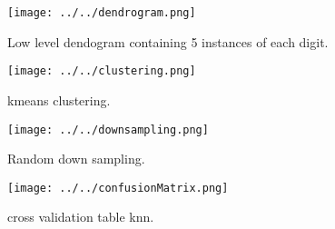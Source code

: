 \documentclass[paper=a4, fontsize=11pt]{scrartcl} %
\begin{document}
\begin{figure}[h]
	\centering
	\texttt{[image: ../../dendrogram.png]}
	\caption{Low level dendogram containing 5 instances of each digit.}
	\label{fig:scree}
\end{figure}

\begin{figure}[h]
	\centering
	\texttt{[image: ../../clustering.png]}
	\caption{kmeans clustering.}
	\label{fig:scree}
\end{figure}

\begin{figure}[h]
	\centering
	\texttt{[image: ../../downsampling.png]}
	\caption{Random down sampling.}
	\label{fig:scree}
\end{figure}
\begin{figure}[h]
	\centering
	\texttt{[image: ../../confusionMatrix.png]}
	\caption{cross validation table knn.}
	\label{fig:scree}
\end{figure}








\begin{flushleft}
\end{flushleft}

\begin{flushleft}
\end{flushleft}
\end{document}
